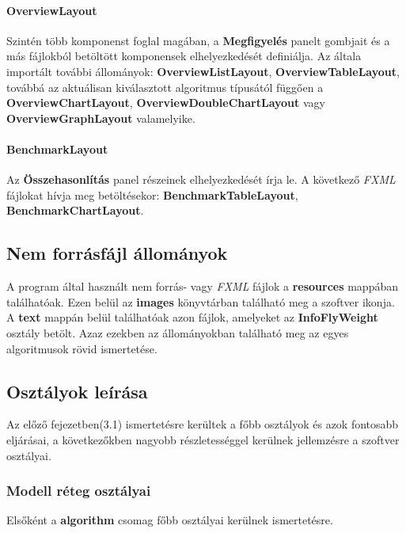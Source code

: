 \documentclass{elteikthesis}
\begin{document}
\paragraph{OverviewLayout}
Szintén több komponenst foglal magában, a \textbf{Megfigyelés} panelt gombjait és a más fájlokból betöltött komponensek elhelyezkedését definiálja. Az általa importált további állományok: \textbf{OverviewListLayout}, \textbf{OverviewTableLayout}, továbbá az aktuálisan kiválasztott algoritmus típusától függően a \textbf{OverviewChartLayout}, \textbf{OverviewDoubleChartLayout} vagy \textbf{OverviewGraphLayout} valamelyike.
\paragraph{BenchmarkLayout}
Az \textbf{Összehasonlítás} panel részeinek elhelyezkedését írja le. A következő \emph{FXML} fájlokat hívja meg betöltésekor: \textbf{BenchmarkTableLayout}, \textbf{BenchmarkChartLayout}.

\subsection{Nem forrásfájl állományok}
A program által használt nem forrás- vagy \emph{FXML} fájlok a \textbf{resources} mappában találhatóak. Ezen belül az \textbf{images} könyvtárban található meg a szoftver ikonja. A \textbf{text} mappán belül találhatóak azon fájlok, amelyeket az \textbf{InfoFlyWeight} osztály betölt. Azaz ezekben az állományokban található meg az egyes algoritmusok rövid ismertetése.

\subsection{Osztályok leírása}
Az előző fejezetben(3.1) ismertetésre kerültek a főbb osztályok és azok fontosabb eljárásai, a következőkben nagyobb részletességgel kerülnek jellemzésre a szoftver osztályai.
\subsubsection{Modell réteg osztályai}
Elsőként a \textbf{algorithm} csomag főbb osztályai kerülnek ismertetésre.
\end{document}
